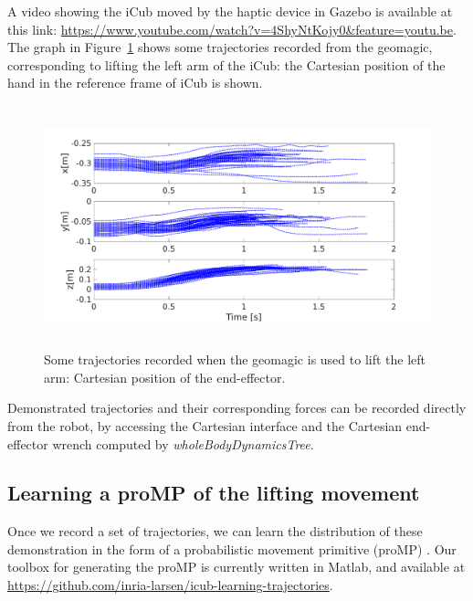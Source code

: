 A video showing the iCub moved by the haptic device in Gazebo is available at this link: \url{https://www.youtube.com/watch?v=4ShyNtKojy0&feature=youtu.be}.
The graph in Figure~\ref{fig:trajectories} shows some trajectories recorded from the geomagic, corresponding to lifting the left arm of the iCub: the Cartesian position of the hand in the reference frame of iCub is shown.
\begin{figure}[h]
\centering
\includegraphics[height=7cm]{figs/geomagic_lifting_trajectories.pdf}
\caption{Some trajectories recorded when the geomagic is used to lift the left arm: Cartesian position of the end-effector.}
\label{fig:trajectories}
\end{figure}

Demonstrated trajectories and their corresponding forces can be recorded directly from the robot, by accessing the Cartesian interface and the Cartesian end-effector wrench computed by \textit{wholeBodyDynamicsTree}.



 


\subsection{Learning a proMP of the lifting movement}

Once we record a set of trajectories, we can learn the distribution of these demonstration in the form of a probabilistic movement primitive (proMP) \cite{Paraschos_NIPS_2013a}.
Our toolbox for generating the proMP is currently written in Matlab, and available at \url{https://github.com/inria-larsen/icub-learning-trajectories}.

